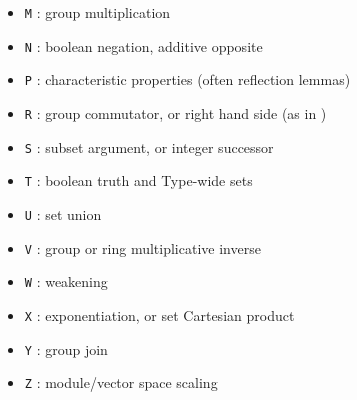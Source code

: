 \begin{itemize}
\begin{itemize}
\begin{itemize}
    \item {\tt M} : group multiplication
    \item {\tt N} : boolean negation, additive opposite
    \item {\tt P} : characteristic properties (often reflection
      lemmas)
    \item {\tt R} : group commutator, or right hand side (as in
      )
    \item {\tt S} : subset argument, or integer successor
    \item {\tt T} : boolean truth and Type-wide sets
    \item {\tt U} : set union
    \item {\tt V} : group or ring multiplicative inverse
    \item {\tt W} : weakening
    \item {\tt X} : exponentiation, or set Cartesian product
    \item {\tt Y} : group join
    \item {\tt Z} : module/vector space scaling
    \end{itemize}
  \end{itemize}
\end{itemize}


%
%

